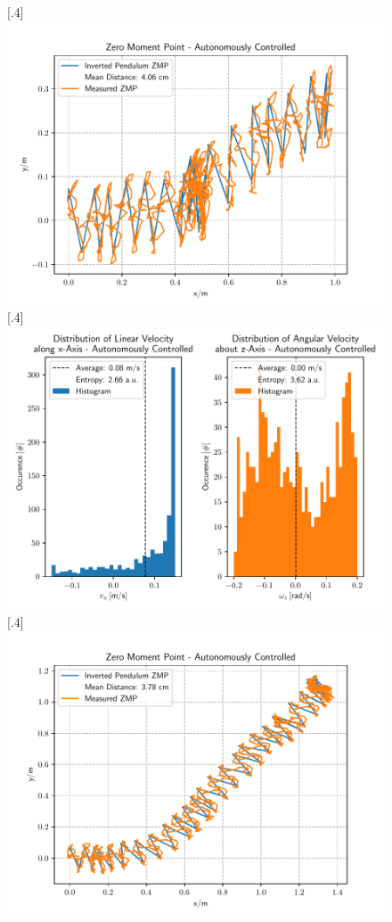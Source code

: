 \begin{figure}[h]
	\centering
	[.4\linewidth]{\includegraphics[scale=.35]{chapters/05_experiments/04_autonomous_walking/dynamic_walk_01_zmp.pdf}}
	[.4\linewidth]{\includegraphics[scale=.35]{chapters/05_experiments/04_autonomous_walking/dynamic_walk_01_entropy.pdf}}
	[.4\linewidth]{\includegraphics[scale=.35]{chapters/05_experiments/04_autonomous_walking/semantic_walk_01_zmp.pdf}}

\end{figure}
